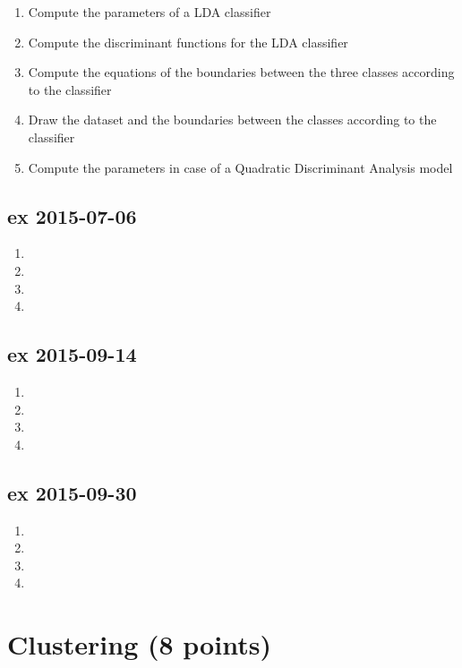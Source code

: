 \documentclass[a4paper,12pt,titlepage]{article} %
\begin{document}
\begin{enumerate}
\item Compute the parameters of a LDA classifier
\item Compute the discriminant functions for the LDA classifier
\item Compute the equations of the boundaries between the three classes according to
the classifier
\item Draw the dataset and the boundaries between the classes according to the classifier
\item Compute the parameters in case of a Quadratic Discriminant Analysis model
\end{enumerate}

\subsection{ex 2015-07-06}
\begin{enumerate}
\item
\item
\item
\item 
\end{enumerate}

\subsection{ex 2015-09-14}
\begin{enumerate}
\item
\item
\item
\item 
\end{enumerate}

\subsection{ex 2015-09-30}
\begin{enumerate}
\item
\item
\item
\item 
\end{enumerate}

\section{Clustering (8 points)}
\end{document}
